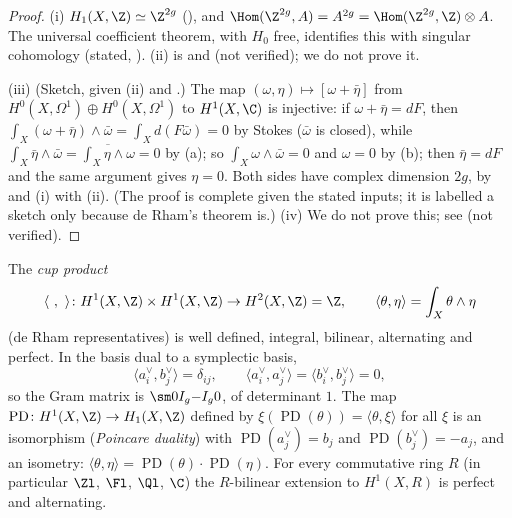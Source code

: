 \begin{proof}
(i) $H_1(X,\Z)\simeq\Z^{2g}$ (), and $\Hom(\Z^{2g},A)=A^{2g}=\Hom(\Z^{2g},\Z)\otimes A$. The universal coefficient theorem, with $H_0$ free,
identifies this with singular cohomology (stated, \cite[Section 3.1]{Hatcher02}). (ii) is \cite[Chapter VIII]{Miranda} and \cite[Sections 10 and 19]{Forster81}
(not verified); we do not prove it.

(iii) (Sketch, given (ii) and .) The map $(\omega,\eta)\mapsto[\omega+\bar\eta]$ from $H^0(X,\Omega^1)\oplus H^0(X,\Omega^1)$ to $H^1(X,\C)$ is
injective: if $\omega+\bar\eta=dF$, then $\int_X(\omega+\bar\eta)\wedge\bar\omega=\int_Xd(F\bar\omega)=0$ by Stokes ($\bar\omega$ is closed), while
$\int_X\bar\eta\wedge\bar\omega=\overline{\int_X\eta\wedge\omega}=0$ by (a); so $\int_X\omega\wedge\bar\omega=0$ and $\omega=0$ by
(b); then $\bar\eta=dF$ and the same argument gives $\eta=0$. Both sides have complex dimension $2g$, by
 and (i) with (ii). (The proof is complete given the stated inputs; it is labelled a sketch only because de Rham's theorem is.)
(iv) We do not prove this; see \cite[Section 1.B]{Hatcher02} (not verified).
\end{proof}

\begin{theorem}\label{thm:curves:cup-product}
The \emph{cup product}
\[
\langle\ ,\ \rangle\colon H^1(X,\Z)\times H^1(X,\Z)\to H^2(X,\Z)=\Z,\qquad\langle\theta,\eta\rangle=\int_X\theta\wedge\eta
\]
(de Rham representatives) is well defined, integral, bilinear, alternating and perfect. In the basis dual to a symplectic basis,
\[
\langle a_i^\vee,b_j^\vee\rangle=\delta_{ij},\qquad\langle a_i^\vee,a_j^\vee\rangle=\langle b_i^\vee,b_j^\vee\rangle=0,
\]
so the Gram matrix is $\sm0{I_g}{-I_g}0$, of determinant $1$. The map $\operatorname{PD}\colon H^1(X,\Z)\to H_1(X,\Z)$ defined by $\xi(\operatorname{PD}(\theta))=\langle\theta,\xi\rangle$ for all
$\xi$ is an isomorphism (\emph{Poincare duality}) with $\operatorname{PD}(a_j^\vee)=b_j$ and $\operatorname{PD}(b_j^\vee)=-a_j$, and an isometry:
$\langle\theta,\eta\rangle=\operatorname{PD}(\theta)\cdot\operatorname{PD}(\eta)$. For every commutative ring $R$ (in particular $\Zl$, $\Fl$, $\Ql$, $\C$) the $R$-bilinear extension to
$H^1(X,R)$ is perfect and alternating.
\end{theorem}

